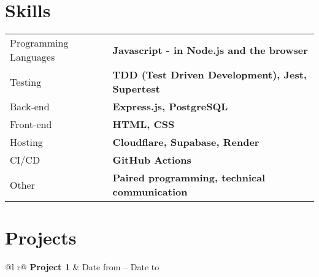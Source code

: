 \documentclass[a4paper,12pt]{article}
\begin{document}

\section{Skills}
\begin{tabularx}{\linewidth}{@{}l X@{}}
    Programming Languages \hspace{10px} & \textbf{Javascript - in Node.js and the browser}        \\
    Testing                             & \textbf{TDD (Test Driven Development), Jest, Supertest} \\
    Back-end                            & \textbf{Express.js, PostgreSQL}                         \\
    Front-end                           & \textbf{HTML, CSS}                                      \\
    Hosting                             & \textbf{Cloudflare, Supabase, Render}                   \\
    CI/CD                               & \textbf{GitHub Actions}                                 \\
    Other                               & \textbf{Paired programming, technical communication}    \\%
\end{tabularx}



\section{Projects}

\begin{tabularx}{\linewidth}{ @{}l r@{} }
    \textbf{Project 1} & \hfill Date from -- Date to       \\[2.75pt]
    \vspace{-5mm}                                          \\
     \\
                                                          \\
    \vspace{-3mm}                                          \\
\end{tabularx}
\end{document}
